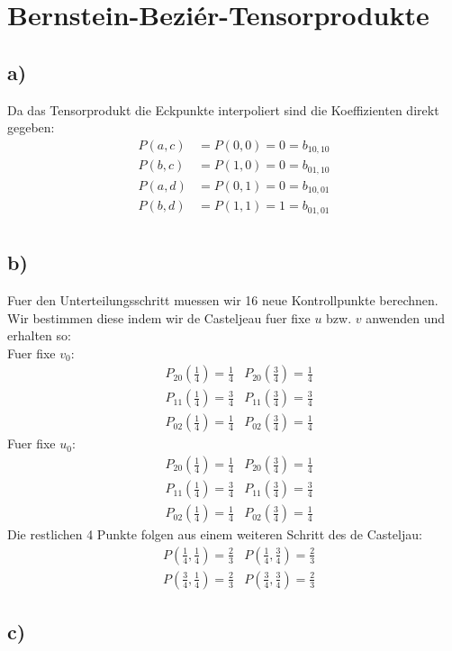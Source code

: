 
\section*{Bernstein-Bezi\'er-Tensorprodukte}
\subsection*{a)} 


Da das Tensorprodukt die Eckpunkte interpoliert sind die Koeffizienten direkt gegeben:
\begin{align}
	P(a,c) &= P(0,0) = 0 = b_{10,10} \\
	P(b,c) &= P(1,0) = 0 = b_{01,10} \\
	P(a,d) &= P(0,1) = 0 = b_{10,01} \\
	P(b,d) &= P(1,1) = 1 = b_{01,01} \\
\end{align}


\subsection*{b)}
Fuer den Unterteilungsschritt muessen wir 16 neue Kontrollpunkte berechnen. Wir bestimmen diese indem wir de Casteljeau fuer fixe $u$ bzw. $v$ anwenden und erhalten so:\\
Fuer fixe $v_0$:
\begin{align}
	&P_{20}(\frac{1}{4}) = \frac{1}{4} 
	&P_{20}(\frac{3}{4}) = \frac{1}{4} \\
	&P_{11}(\frac{1}{4}) = \frac{3}{4} 
	&P_{11}(\frac{3}{4}) = \frac{3}{4} \\
	&P_{02}(\frac{1}{4}) = \frac{1}{4} 	
	&P_{02}(\frac{3}{4}) = \frac{1}{4} 
\end{align}
Fuer fixe $u_0$:
\begin{align}
	&P_{20}(\frac{1}{4}) = \frac{1}{4} 
	&P_{20}(\frac{3}{4}) = \frac{1}{4} \\
	&P_{11}(\frac{1}{4}) = \frac{3}{4} 
	&P_{11}(\frac{3}{4}) = \frac{3}{4} \\
	&P_{02}(\frac{1}{4}) = \frac{1}{4} 	
	&P_{02}(\frac{3}{4}) = \frac{1}{4} 
\end{align}
Die restlichen 4 Punkte folgen aus einem weiteren Schritt des de Casteljau:
\begin{align}
	&P(\frac{1}{4},\frac{1}{4}) = \frac{2}{3} 
	&P(\frac{1}{4},\frac{3}{4}) = \frac{2}{3} \\
	&P(\frac{3}{4},\frac{1}{4}) = \frac{2}{3} 
	&P(\frac{3}{4},\frac{3}{4}) = \frac{2}{3} 
\end{align}

\vspace{10cm}

\subsection*{c)}



